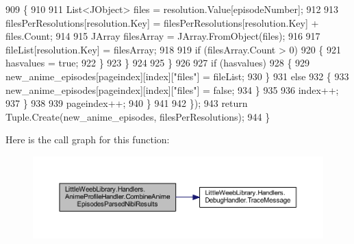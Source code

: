 \begin{DoxyCode}
909                             \{
910 
911                                 List<JObject> files = resolution.Value[episodeNumber];
912 
913                                 filesPerResolutions[resolution.Key] = filesPerResolutions[resolution.Key] +
       files.Count;
914 
915                                 JArray filesArray = JArray.FromObject(files);
916 
917                                 fileList[resolution.Key] = filesArray;
918 
919                                 \textcolor{keywordflow}{if} (filesArray.Count > 0)
920                                 \{
921                                     hasvalues = \textcolor{keyword}{true};
922                                 \}
923                             \}
924 
925                         \}
926 
927                         \textcolor{keywordflow}{if} (hasvalues)
928                         \{
929                             new\_anime\_episodes[pageindex][index][\textcolor{stringliteral}{"files"}] = fileList;
930                         \}
931                         \textcolor{keywordflow}{else}
932                         \{
933                             new\_anime\_episodes[pageindex][index][\textcolor{stringliteral}{"files"}] = \textcolor{keyword}{false};
934                         \}
935 
936                         index++;
937                     \}
938 
939                     pageindex++;
940                 \}
941                 
942             \});
943             \textcolor{keywordflow}{return} Tuple.Create(new\_anime\_episodes, filesPerResolutions);
944         \}
\end{DoxyCode}
Here is the call graph for this function\+:\nopagebreak
\begin{figure}[H]
\begin{center}
\leavevmode
\includegraphics[width=350pt]{class_little_weeb_library_1_1_handlers_1_1_anime_profile_handler_a132e4da0f082cc2c967cd06eaac3337b_cgraph}
\end{center}
\end{figure}
\mbox{\label{class_little_weeb_library_1_1_handlers_1_1_anime_profile_handler_a2f28ad03d4dfe8d90c0392da8af39651}} 
